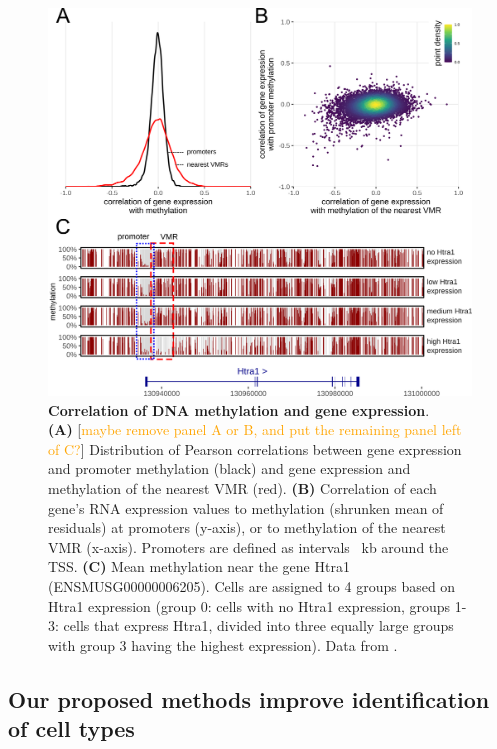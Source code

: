\documentclass[twocolumn,10pt]{article}
\newcommand{\todo}[1]{[\textcolor{orange}{#1}]}
\begin{document}
\begin{figure}
    \begin{center}
    \includegraphics[width=.65\textwidth]{figures/Fig_correlation.png}
    \end{center}
    \caption{\small \textbf{Correlation of DNA methylation and gene expression}.\\
    \textbf{(A)} \todo{maybe remove panel A or B, and put the remaining panel left of C?} Distribution of Pearson correlations between gene expression and promoter methylation (black) and gene expression and methylation of the nearest VMR (red).
    \textbf{(B)} Correlation of each gene's RNA expression values to methylation (shrunken mean of residuals) at promoters (y-axis), or to methylation of the nearest VMR (x-axis).
    Promoters are defined as intervals ~kb around the TSS.
    \textbf{(C)} Mean methylation near the gene Htra1 (ENSMUSG00000006205).
    Cells are assigned to 4 groups based on Htra1 expression (group 0: cells with no Htra1 expression, groups 1-3: cells that express Htra1, divided into three equally large groups with group 3 having the highest expression).
    Data from \citet{kremer_scnmt}.}
    \label{fig:correlation}
\end{figure}


\subsection{Our proposed methods improve identification of cell types}
\end{document}
